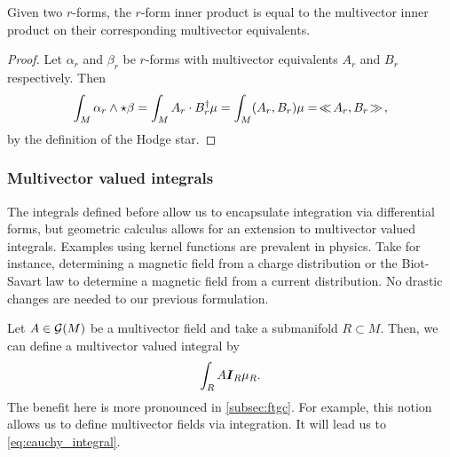 \begin{proposition}
Given two $r$-forms, the $r$-form inner product is equal to the multivector inner product on their corresponding multivector equivalents.
\end{proposition}
\begin{proof}
Let $\alpha_r$ and $\beta_r$ be $r$-forms with multivector equivalents $A_r$ and $B_r$ respectively. Then
\begin{align*}
    \int_M \alpha_r \wedge \star \beta = \int_M A_r \cdot B_r^\dagger \mu = \int_M (A_r,B_r) \mu =\hspace*{.5mm}\ll \hspace*{-.5mm} A_r, B_r \hspace*{-.5mm}\gg \hspace*{.5mm},
\end{align*}
by the definition of the Hodge star.
\end{proof}


\subsubsection{Multivector valued integrals}

The integrals defined before allow us to encapsulate integration via differential forms, but geometric calculus allows for an extension to multivector valued integrals. Examples using kernel functions are prevalent in physics. Take for instance, determining a magnetic field from a charge distribution or the Biot-Savart law to determine a magnetic field from a current distribution. No drastic changes are needed to our previous formulation. 

Let $A\in \mathcal{G}(M)$ be a multivector field and take a submanifold $R\subset M$. Then, we can define a multivector valued integral by
\begin{equation}
\int_R A \boldsymbol{I}_R \mu_R.
\end{equation}
The benefit here is more pronounced in \cref{subsec:ftgc}. For example, this notion allows us to define multivector fields via integration. It will lead us to \cref{eq:cauchy_integral}.






